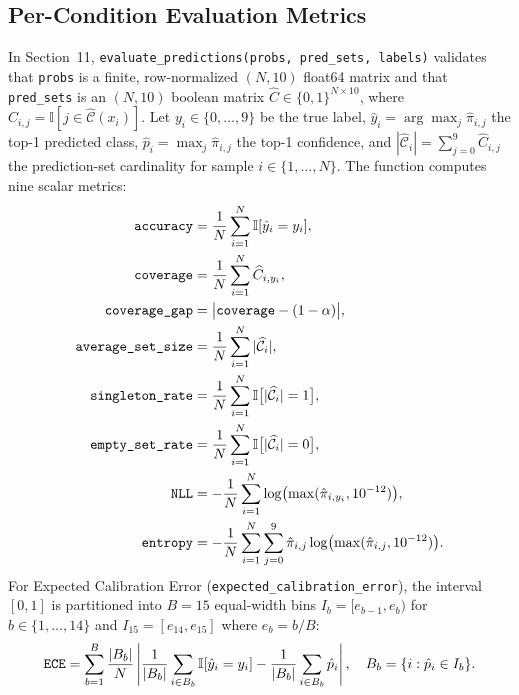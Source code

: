 \documentclass[11pt,a4paper]{article}
\begin{document}
\subsection{Per-Condition Evaluation Metrics}
In Section~11, \texttt{evaluate\_\allowbreak{}predictions(probs, pred\_\allowbreak{}sets, labels)} validates that \texttt{probs} is a finite, row-normalized $(N, 10)$ float64 matrix and that \texttt{pred\_\allowbreak{}sets} is an $(N, 10)$ boolean matrix $\widehat{C} \in \{0, 1\}^{N \times 10}$, where $\widehat{C}_{i, j} = \mathbb{I}[j \in \widehat{\mathcal{C}}(x_i)]$. Let $y_i \in \{0, \dots, 9\}$ be the true label, $\hat{y}_i = \arg\max_{j} \hat{\pi}_{i, j}$ the top-1 predicted class, $\hat{p}_i = \max_{j} \hat{\pi}_{i, j}$ the top-1 confidence, and $|\widehat{\mathcal{C}}_i| = \sum_{j=0}^{9} \widehat{C}_{i, j}$ the prediction-set cardinality for sample $i \in \{1, \dots, N\}$. The function computes nine scalar metrics:
\begin{align}
  \text{\texttt{accuracy}} &= \frac{1}{N} \sum_{i=1}^{N} \mathbb{I}[\hat{y}_i = y_i], \\
  \text{\texttt{coverage}} &= \frac{1}{N} \sum_{i=1}^{N} \widehat{C}_{i, y_i}, \\
  \text{\texttt{coverage\_\allowbreak{}gap}} &= \bigl|\text{\texttt{coverage}} - (1 - \alpha)\bigr|, \\
  \text{\texttt{average\_\allowbreak{}set\_\allowbreak{}size}} &= \frac{1}{N} \sum_{i=1}^{N} |\widehat{\mathcal{C}}_i|, \\
  \text{\texttt{singleton\_\allowbreak{}rate}} &= \frac{1}{N} \sum_{i=1}^{N} \mathbb{I}\bigl[|\widehat{\mathcal{C}}_i| = 1\bigr], \\
  \text{\texttt{empty\_\allowbreak{}set\_\allowbreak{}rate}} &= \frac{1}{N} \sum_{i=1}^{N} \mathbb{I}\bigl[|\widehat{\mathcal{C}}_i| = 0\bigr], \\
  \text{\texttt{NLL}} &= -\frac{1}{N} \sum_{i=1}^{N} \log\bigl(\max(\hat{\pi}_{i, y_i}, 10^{-12})\bigr), \\
  \text{\texttt{entropy}} &= -\frac{1}{N} \sum_{i=1}^{N} \sum_{j=0}^{9} \hat{\pi}_{i, j} \log\bigl(\max(\hat{\pi}_{i, j}, 10^{-12})\bigr).
\end{align}
For Expected Calibration Error (\texttt{expected\_\allowbreak{}calibration\_\allowbreak{}error}), the interval $[0, 1]$ is partitioned into $B = 15$ equal-width bins $I_b = [e_{b-1}, e_b)$ for $b \in \{1, \dots, 14\}$ and $I_{15} = [e_{14}, e_{15}]$ where $e_b = b / B$:
\begin{equation}
  \label{eq:ece}
  \text{\texttt{ECE}} = \sum_{b=1}^{B} \frac{|B_b|}{N} \left| \frac{1}{|B_b|} \sum_{i \in B_b} \mathbb{I}[\hat{y}_i = y_i] - \frac{1}{|B_b|} \sum_{i \in B_b} \hat{p}_i \right|, \quad B_b = \{i : \hat{p}_i \in I_b\}.
\end{equation}
\end{document}
